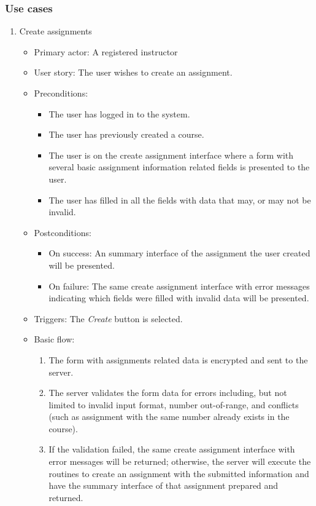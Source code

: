 \subsubsection{Use cases}
\begin{enumerate}
\item Create assignments
\begin{itemize}
    \item Primary actor: A registered instructor
    \item User story: The user wishes to create an assignment.
    \item Preconditions:
        \begin{itemize}
            \item The user has logged in to the system.
            \item The user has previously created a course.
            \item The user is on the create assignment interface where a form
                with several basic assignment information related fields is
                presented to the user.
            \item The user has filled in all the fields with data that may,
                or may not be invalid.
        \end{itemize}
    \item Postconditions:
        \begin{itemize}
            \item On success: An summary interface of the assignment the user
                created will be presented.
            \item On failure: The same create assignment interface with error
                messages indicating which fields were filled with invalid data
                will be presented.
        \end{itemize}
    \item Triggers: The \emph{Create} button is selected.
    \item Basic flow:
        \begin{enumerate}
            \item The form with assignments related data is encrypted and sent
                to the server.
            \item The server validates the form data for errors  including,
                but not limited to invalid input format,  number out-of-range,
                and conflicts (such as assignment with the same number already
                exists in the course).
            \item If the validation failed, the same create assignment interface
                with error messages will be returned; otherwise, the server will
                execute the routines to create an assignment with the submitted
                information and have the summary interface of that assignment
                prepared and returned.
        \end{enumerate}
\end{itemize}


\end{enumerate}
